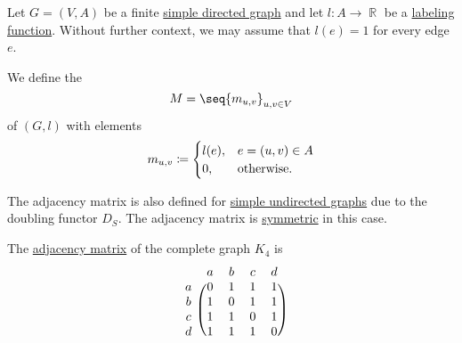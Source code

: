\begin{definition}\label{def:graph_adjacency_matrix}
  Let \( G = (V, A) \) be a finite \hyperref[def:directed_graph]{simple directed graph} and let \( l: A \to \BbbR \) be a \hyperref[def:labeled_set]{labeling function}. Without further context, we may assume that \( l(e) = 1 \) for every edge \( e \).

  We define the 
  \begin{equation*}
    M = \seq{ m_{u,v} }_{u,v \in V}
  \end{equation*}
  of \( (G, l) \) with elements
  \begin{equation*}
    m_{u,v} \coloneqq \begin{cases}
      l(e), &e = (u, v) \in A \\
      0,    &\T{otherwise.}
    \end{cases}
  \end{equation*}
\end{definition}
\begin{comments}
  \item The adjacency matrix is also defined for \hyperref[def:undirected_graph]{simple undirected graphs} due to the doubling functor \hyperref[def:graph_functors/simple_doubling]{\( D_S \)}. The adjacency matrix is \hyperref[def:transpose_matrix]{symmetric} in this case.
\end{comments}

\begin{example}\label{ex:def:graph_adjacency_matrix}
  The \hyperref[def:graph_adjacency_matrix]{adjacency matrix} of the complete graph \hyperref[fig:ex:complete_graph]{\( K_4 \)} is
  \begin{equation}\label{eq:ex:def:graph_adjacency_matrix}
    \begin{blockarray}{ccccc}
        & a & b & c & d \\
    \begin{block}{c(cccc)}
      a & 0 & 1 & 1 & 1 \\
      b & 1 & 0 & 1 & 1 \\
      c & 1 & 1 & 0 & 1 \\
      d & 1 & 1 & 1 & 0 \\
    \end{block}
    \end{blockarray}
  \end{equation}
\end{example}

